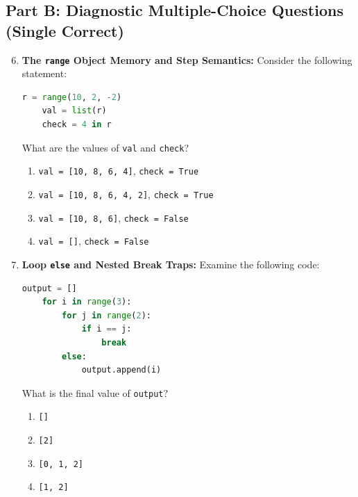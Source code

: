 \subsection*{Part B: Diagnostic Multiple-Choice Questions (Single Correct)}

\begin{enumerate}
    \setcounter{enumi}{5}
    \item \textbf{The \texttt{range} Object Memory and Step Semantics:}
    Consider the following statement:
    \begin{lstlisting}[language=Python]
    r = range(10, 2, -2)
    val = list(r)
    check = 4 in r
    \end{lstlisting}
    What are the values of \texttt{val} and \texttt{check}?
    \begin{enumerate}
        \item \texttt{val = [10, 8, 6, 4]}, \quad \texttt{check = True}
        \item \texttt{val = [10, 8, 6, 4, 2]}, \quad \texttt{check = True}
        \item \texttt{val = [10, 8, 6]}, \quad \texttt{check = False}
        \item \texttt{val = []}, \quad \texttt{check = False}
    \end{enumerate}

    \item \textbf{Loop \texttt{else} and Nested Break Traps:}
    Examine the following code:
    \begin{lstlisting}[language=Python]
    output = []
    for i in range(3):
        for j in range(2):
            if i == j:
                break
        else:
            output.append(i)
    \end{lstlisting}
    What is the final value of \texttt{output}?
    \begin{enumerate}
        \item \texttt{[]}
        \item \texttt{[2]}
        \item \texttt{[0, 1, 2]}
        \item \texttt{[1, 2]}
    \end{enumerate}
\end{enumerate}
